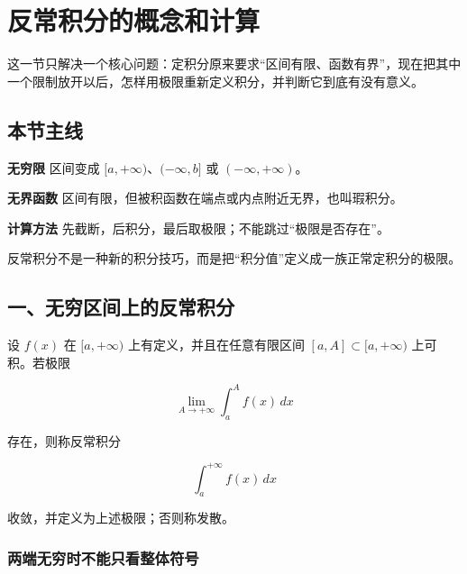 \section{反常积分的概念和计算}

这一节只解决一个核心问题：定积分原来要求“区间有限、函数有界”，现在把其中一个限制放开以后，怎样用极限重新定义积分，并判断它到底有没有意义。

\subsection*{本节主线}

\begin{conceptbox}
\textbf{无穷限}
区间变成 \([a,+\infty)\)、\((-\infty,b]\) 或 \((-\infty,+\infty)\)。
\end{conceptbox}

\begin{conceptbox}
\textbf{无界函数}
区间有限，但被积函数在端点或内点附近无界，也叫瑕积分。
\end{conceptbox}

\begin{conceptbox}
\textbf{计算方法}
先截断，后积分，最后取极限；不能跳过“极限是否存在”。
\end{conceptbox}

\begin{notebox}
反常积分不是一种新的积分技巧，而是把“积分值”定义成一族正常定积分的极限。
\end{notebox}

\subsection*{一、无穷区间上的反常积分}

设 \(f(x)\) 在 \([a,+\infty)\) 上有定义，并且在任意有限区间 \([a,A]\subset[a,+\infty)\) 上可积。若极限

\[
      \lim_{A\to+\infty}\int_a^A f(x)\,dx
    \]

存在，则称反常积分

\[
      \int_a^{+\infty} f(x)\,dx
    \]

收敛，并定义为上述极限；否则称发散。

\subsubsection*{两端无穷时不能只看整体符号}

